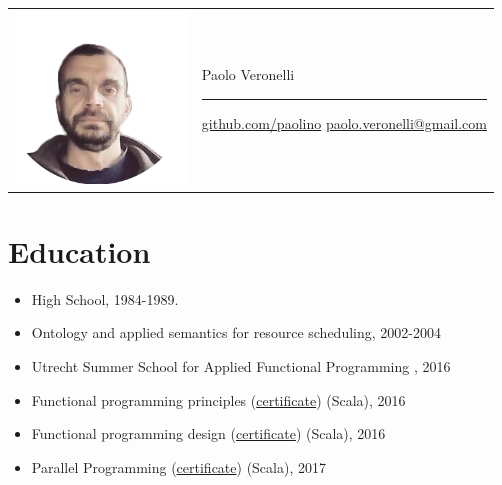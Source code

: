 \documentclass[letterpaper,12pt,oneside]{article}
\begin{document}
    \begin{tabular}{m{4.2in} m{2.5in}}
        \includegraphics[width=1.8in,left]{photo.png} &
        \vspace{1in}

        \begin{flushright}
        {
        \Huge{Paolo Veronelli}  
        \noindent\rule{2.5in}{0.2pt}
        \begin{normalsize}
        \href{https://github.com/paolino}{github.com/paolino}  
        \href{mailto:paolo.veronelli@gmail.com}{paolo.veronelli@gmail.com}
        \end{normalsize}
        }
        \end{flushright}
        \end{tabular}
    \section*{Education}
        \begin{itemize}
            \item High School, 1984-1989.
            \item Ontology and applied semantics for resource scheduling, 2002-2004 
            \item Utrecht Summer School for Applied Functional Programming , 2016
            \item Functional programming principles (\href{https://www.coursera.org/account/accomplishments/certificate/8NVXL4Y3XUB6}{certificate}) (Scala), 2016
            \item Functional programming design (\href{https://www.coursera.org/account/accomplishments/certificate/WTU8B8G54N79}{certificate}) (Scala), 2016
            \item Parallel Programming (\href{https://www.coursera.org/account/accomplishments/certificate/YU7BSRL8VFTT}{certificate}) (Scala), 2017
        \end{itemize}
\end{document}
